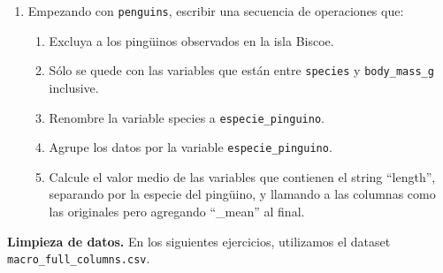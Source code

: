 \documentclass[a4paper,11pt]{article}
\theoremstyle{definition}
\begin{document}
\begin{enumerate}
\item Empezando con \lstinline{penguins}, escribir una secuencia de operaciones que:
\begin{enumerate}
\item Excluya a los ping\"uinos observados en la isla Biscoe.
\item Sólo se quede con las variables que están entre \lstinline{species} y \lstinline{body_mass_g} inclusive.
\item Renombre la variable species a \lstinline{especie_pinguino}.
\item Agrupe los datos por la variable \lstinline{especie_pinguino}.
\item Calcule el valor medio de las variables que contienen el string ``length'', separando por la especie del ping\"uino, y llamando a las columnas como las originales pero agregando ``\_mean'' al final.
\end{enumerate}


\end{enumerate}
\textbf{Limpieza de datos.}
En los siguientes ejercicios, utilizamos el dataset \lstinline{macro_full_columns.csv}.
\end{document}
